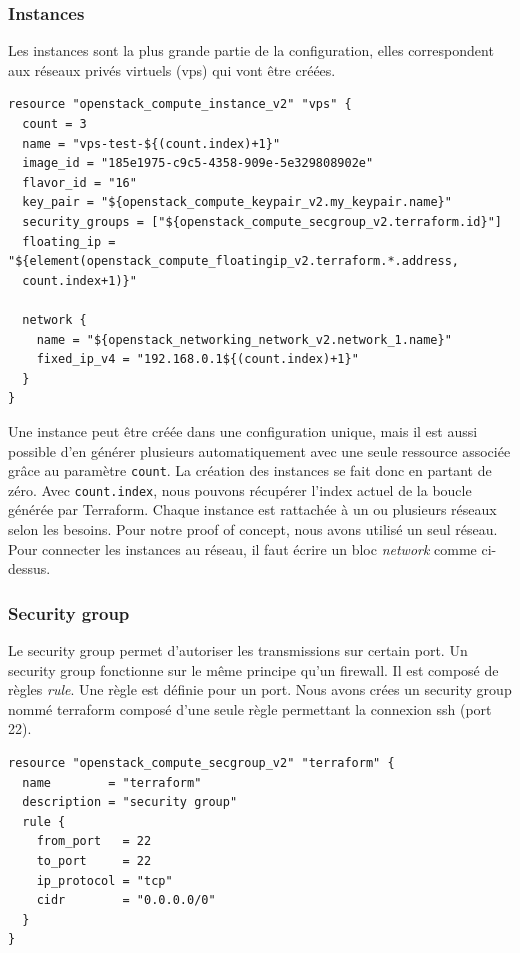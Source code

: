 \documentclass[]{article}
\begin{document}
\subsubsection{Instances}\label{instances}

Les instances sont la plus grande partie de la configuration, elles
correspondent aux réseaux privés virtuels (vps) qui vont être créées.
\begin{verbatim}
resource "openstack_compute_instance_v2" "vps" {
  count = 3
  name = "vps-test-${(count.index)+1}"
  image_id = "185e1975-c9c5-4358-909e-5e329808902e"
  flavor_id = "16"
  key_pair = "${openstack_compute_keypair_v2.my_keypair.name}"
  security_groups = ["${openstack_compute_secgroup_v2.terraform.id}"]
  floating_ip = "${element(openstack_compute_floatingip_v2.terraform.*.address,
  count.index+1)}"

  network {
    name = "${openstack_networking_network_v2.network_1.name}"
    fixed_ip_v4 = "192.168.0.1${(count.index)+1}"
  }
}
\end{verbatim}
Une instance peut être créée dans une configuration unique, mais il est aussi possible d'en générer plusieurs automatiquement avec une seule ressource associée grâce au paramètre \texttt{count}.
La création des instances se fait donc en partant de zéro. Avec \texttt{count.index}, nous pouvons récupérer l'index actuel de la boucle générée par Terraform. Chaque instance est rattachée à un ou plusieurs réseaux selon les besoins. Pour notre proof of concept, nous avons utilisé un seul réseau. Pour connecter les instances au réseau, il faut écrire un bloc \textit{network} comme ci-dessus.

\subsubsection{Security group}\label{security-group}

Le security group permet d'autoriser les transmissions sur certain port.
Un security group fonctionne sur le même principe qu'un firewall. Il est
composé de règles \emph{rule}. Une règle est définie pour un port. Nous
avons crées un security group nommé \og terraform
\fg composé d'une seule règle permettant la connexion ssh
(port 22).
\begin{verbatim}
resource "openstack_compute_secgroup_v2" "terraform" {
  name        = "terraform"
  description = "security group"
  rule {
    from_port   = 22
    to_port     = 22
    ip_protocol = "tcp"
    cidr        = "0.0.0.0/0"
  }
}
\end{verbatim}
\end{document}
